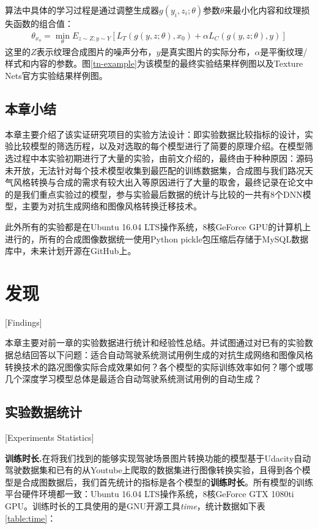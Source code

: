 算法中具体的学习过程是通过调整生成器$g(y_i,z_i;\theta)$参数$\theta$来最小化内容和纹理损失函数的组合值：
\begin{align}
    \theta_{x_o}=\min_{\theta}E_{z\sim Z;y\sim Y}[L_T(g(y,z;\theta),x_0)+\alpha L_C(g(y,z;\theta),y)]
\end{align}
这里的$Z$表示纹理合成图片的噪声分布，$y$是真实图片的实际分布，$\alpha$是平衡纹理/样式和内容的参数。图\ref{tn-example}为该模型的最终实验结果样例图以及Texture Nets官方实验结果样例图。


\section{本章小结}

本章主要介绍了该实证研究项目的实验方法设计：即实验数据比较指标的设计，实验比较模型的筛选历程，以及对选取的每个模型进行了简要的原理介绍。在模型筛选过程中本实验初期进行了大量的实验，由前文介绍的，最终由于种种原因：源码未开放，无法针对每个技术模型收集到最匹配的训练数据集，合成图与我们路况天气风格转换与合成的需求有较大出入等原因进行了大量的取舍，最终记录在论文中的是我们重点实验过的模型，参与实验最后数据的统计与比较的一共有8个DNN模型，主要为对抗生成网络和图像风格转换迁移技术。

此外所有的实验都是在Ubuntu 16.04 LTS操作系统，8核GeForce GPU的计算机上进行的，所有的合成图像数据统一使用Python pickle包压缩后存储于MySQL数据库中，未来计划开源在GitHub上。


\chapter{发现}[Findings]

本章主要对前一章的实验数据进行统计和经验性总结。并试图通过对已有的实验数据总结回答以下问题：适合自动驾驶系统测试用例生成的对抗生成网络和图像风格转换技术的路况图像实际合成效果如何？各个模型的实际训练效率如何？哪个或哪几个深度学习模型总体是最适合自动驾驶系统测试用例的自动生成？

\section{实验数据统计}[Experiments Statistics]

\textbf{训练时长.}\quad 在将我们找到的能够实现驾驶场景图片转换功能的模型基于Udacity自动驾驶数据集\cite{udacity_dataset}和已有的从Youtube上爬取的数据集进行图像转换实验，且得到各个模型是合成图数据后，我们首先统计的指标是各个模型的\textbf{训练时长}。所有模型的训练平台硬件环境都一致：Ubuntu 16.04 LTS操作系统，8核GeForce GTX 1080ti GPU。训练时长的工具使用的是GNU开源工具\textit{time}，统计数据如下表\ref{table:time}：

